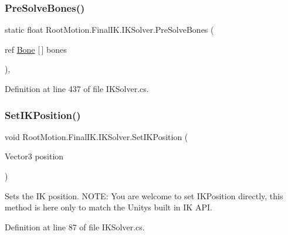 \subsubsection{\texorpdfstring{Pre\+Solve\+Bones()}{PreSolveBones()}}
{\footnotesize\ttfamily static float Root\+Motion.\+Final\+I\+K.\+I\+K\+Solver.\+Pre\+Solve\+Bones (\begin{DoxyParamCaption}\item[{ref \mbox{\hyperlink{class_root_motion_1_1_final_i_k_1_1_i_k_solver_1_1_bone}{Bone}} \mbox{[}$\,$\mbox{]}}]{bones }\end{DoxyParamCaption})\hspace{0.3cm}{\ttfamily [static]}, {\ttfamily [protected]}}



Definition at line 437 of file I\+K\+Solver.\+cs.

\mbox{\label{class_root_motion_1_1_final_i_k_1_1_i_k_solver_add472956cde95ced7d35975a5a62167b}} 
\subsubsection{\texorpdfstring{Set\+I\+K\+Position()}{SetIKPosition()}}
{\footnotesize\ttfamily void Root\+Motion.\+Final\+I\+K.\+I\+K\+Solver.\+Set\+I\+K\+Position (\begin{DoxyParamCaption}\item[{Vector3}]{position }\end{DoxyParamCaption})}



Sets the IK position. N\+O\+TE\+: You are welcome to set I\+K\+Position directly, this method is here only to match the Unity\textquotesingle{}s built in IK A\+PI. 



Definition at line 87 of file I\+K\+Solver.\+cs.

\mbox{\label{class_root_motion_1_1_final_i_k_1_1_i_k_solver_aa7a25a1a22a0c48fc276a2c34377c00d}} 
